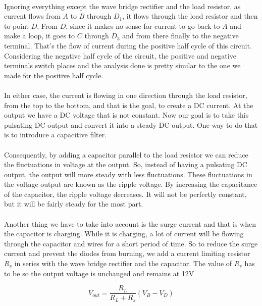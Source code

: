 \paragraph{} Ignoring  everything except the wave bridge
rectifier and the load resistor, as current flows from $A$ to $B$ through $D_1$, it flows through
the load resistor and then to point $D$. From $D$, since it makes no sense for current to go back
to $A$ and make a loop, it goes to $C$ through $D_3$ and from there finally to the  negative terminal.
That's the flow of current during the positive half cycle of this circuit. Considering the negative
half cycle of the circuit, the positive and negative terminals switch places and the analysis done
is pretty similar to the one we made for the positive half cycle.
\paragraph{} In either case, the current is
flowing in one direction through the load resistor, from the top to the bottom, and that is the goal,
to create a DC current. At the output we have a DC voltage that is not constant. Now our goal is to
take this pulsating DC output and convert it into a steady DC output. One way to do that is to
introduce a capacitive filter.
\paragraph{}Consequently, by adding a capacitor parallel to the load resistor
we can reduce the fluctuations in voltage at  the output. So, instead of having a pulsating DC
output, the output will more steady with less fluctuations. These fluctuations in the voltage output
are known as the ripple voltage. By increasing the capacitance of the capacitor, the ripple voltage
decreases.  It will not be perfectly constant, but it will be fairly steady for the most part.
\paragraph{}Another thing we have to take into account is the surge current and that is when the capacitor
is charging. While it is charging, a lot of current will be flowing through the capacitor and wires
for a short period of time. So to reduce the surge current and prevent the diodes from burning, we
add a current limiting resistor $R_s$ in series with the wave bridge rectifier and the capacitor.
The value of $R_s$ has to be so the output voltage is unchanged and remains at 12V

\begin{equation}
    V_{out} = \frac{R_L}{R_L + R_s} (V_B - V_D)
    \label{vout}
\end{equation}
